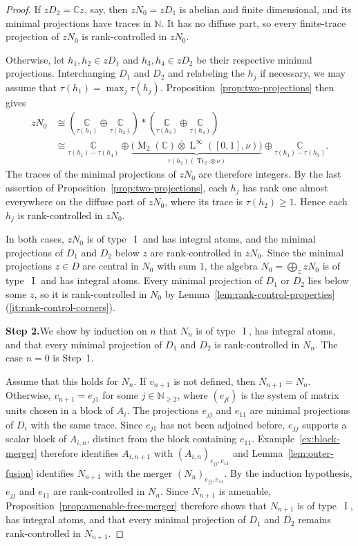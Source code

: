 \documentclass[11pt]{amsart}
\numberwithin{equation}{section}
\newcommand{\nn}{\mathbb N}
\newcommand{\cc}{\mathbb C}
\newcommand{\pt}{\otimes}
\newcommand{\ovt}{\mathbin{\overline{\otimes}}}
\DeclareMathOperator{\I}{I}
\DeclareMathOperator{\Tr}{Tr}
\newcommand{\rL}{\operatorname{L}}
\newcommand{\rM}{\operatorname{M}}
\theoremstyle{definition}
\begin{document}
\begin{proof}
    If $zD_2=\cc z$, say, then $zN_0=zD_1$ is abelian and finite dimensional, and its minimal projections have traces in $\nn$. It has no diffuse part, so every finite-trace projection of $zN_0$ is rank-controlled in $zN_0$.

    Otherwise, let $h_1,h_2\in zD_1$ and $h_3,h_4\in zD_2$ be their respective minimal projections. Interchanging $D_1$ and $D_2$ and relabeling the $h_j$ if necessary, we may assume that $\tau(h_1)=\max_j\tau(h_j)$. Proposition~\ref{prop:two-projections} then gives
    $$
        \begin{aligned}
            zN_0&\cong\left(\underset{\tau(h_1)}{\cc}\oplus\underset{\tau(h_2)}{\cc}\right)
            \ast\left(\underset{\tau(h_3)}{\cc}\oplus\underset{\tau(h_4)}{\cc}\right)\\
            &\cong\underset{\tau(h_1)-\tau(h_4)}{\cc}
            \oplus\underbrace{\bigl(\rM_2(\cc)\ovt\rL^\infty([0,1],\nu)\bigr)}_{\tau(h_2)(\Tr_2\pt\nu)}
            \oplus\underset{\tau(h_1)-\tau(h_3)}{\cc}.
        \end{aligned}
    $$
    The traces of the minimal projections of $zN_0$ are therefore integers. By the last assertion of Proposition~\ref{prop:two-projections}, each $h_j$ has rank one almost everywhere on the diffuse part of $zN_0$, where its trace is $\tau(h_2)\geq1$. Hence each $h_j$ is rank-controlled in $zN_0$.

    In both cases, $zN_0$ is of type~$\I$ and has integral atoms, and the minimal projections of $D_1$ and $D_2$ below $z$ are rank-controlled in $zN_0$. Since the minimal projections $z\in D$ are central in $N_0$ with sum $1$, the algebra $N_0=\bigoplus_z zN_0$ is of type~$\I$ and has integral atoms. Every minimal projection of $D_1$ or $D_2$ lies below some $z$, so it is rank-controlled in $N_0$ by Lemma~\ref{lem:rank-control-properties}\textup{(\ref*{it:rank-control-corners})}.

    \smallskip
    \noindent\textbf{Step 2.}\enspace We show by induction on $n$ that $N_n$ is of type~$\I$, has integral atoms, and that every minimal projection of $D_1$ and $D_2$ is rank-controlled in $N_n$. The case $n=0$ is Step~1.

    Assume that this holds for $N_n$. If $v_{n+1}$ is not defined, then $N_{n+1}=N_n$. Otherwise, $v_{n+1}=e_{j1}$ for some $j\in\nn_{\geq2}$, where $(e_{jl})$ is the system of matrix units chosen in a block of $A_i$. The projections $e_{jj}$ and $e_{11}$ are minimal projections of $D_i$ with the same trace. Since $e_{j1}$ has not been adjoined before, $e_{jj}$ supports a scalar block of $A_{i,n}$, distinct from the block containing $e_{11}$. 
    Example~\ref{ex:block-merger} therefore identifies $A_{i,n+1}$ with $(A_{i,n})_{e_{jj},e_{11}}$ and Lemma~\ref{lem:outer-fusion} identifies $N_{n+1}$ with the merger $(N_n)_{e_{jj},e_{11}}$. By the induction hypothesis, $e_{jj}$ and $e_{11}$ are rank-controlled in $N_n$. Since $N_{n+1}$ is amenable, Proposition~\ref{prop:amenable-free-merger} therefore shows that $N_{n+1}$ is of type~$\I$, has integral atoms, and that every minimal projection of $D_1$ and $D_2$ remains rank-controlled in $N_{n+1}$.


\end{proof}
\end{document}
